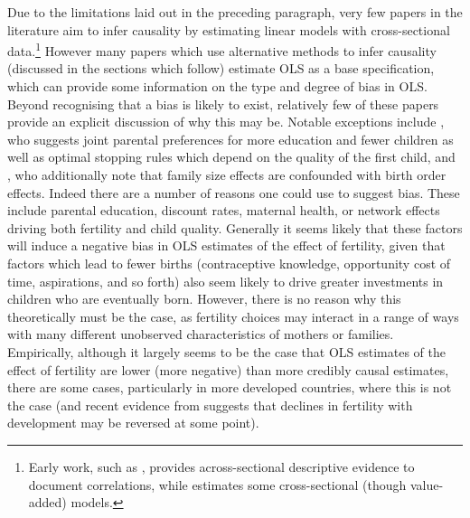 \documentclass{article}
\begin{document}
\begin{spacing}{1.4}
Due to the limitations laid out in the preceding paragraph, very few papers in 
the literature aim to infer causality by estimating linear models with 
cross-sectional data.\footnote{Early work, such as \citet{Desai1995}, provides 
across-sectional descriptive 
evidence to document correlations, while \citet{Hanushek1992} estimates some
cross-sectional (though value-added) models.}  However many papers which use 
alternative methods to infer causality (discussed in the sections which follow)
estimate OLS as a base specification, which can provide some information on the 
type and degree of bias in OLS.  Beyond recognising that a bias is likely to 
exist, relatively few of these papers provide an explicit discussion of why this
may be.  Notable exceptions include \citet{Qian2009}, who suggests joint
parental preferences for more education and fewer children as well as optimal
stopping rules which depend on the quality of the first child, and 
\citet{Blacketal2010}, who additionally note that family size effects are 
confounded with birth order effects.  Indeed there are a number of reasons one
could use to suggest bias.  These include parental education, discount rates,
maternal health, or network effects driving both fertility and child quality.  
Generally it seems likely that these factors will induce a negative bias in OLS
estimates of the effect of fertility, given that factors which lead to fewer 
births (contraceptive knowledge, opportunity cost of time, aspirations, and so 
forth) also seem likely to drive greater investments in children who are 
eventually born.  However, there is no reason why this theoretically must be the
case, as fertility choices may interact in a range of ways with many different 
unobserved characteristics of mothers or families.  Empirically, although it 
largely seems to be the case that OLS estimates of the effect of fertility are 
lower (more negative) than more credibly causal estimates, there are some cases, 
particularly in more developed countries, where this is not the case (and recent 
evidence from \citet{Myrskylaetal2009} suggests that declines in fertility with
development may be reversed at some point). 


\end{spacing}
\end{document}
